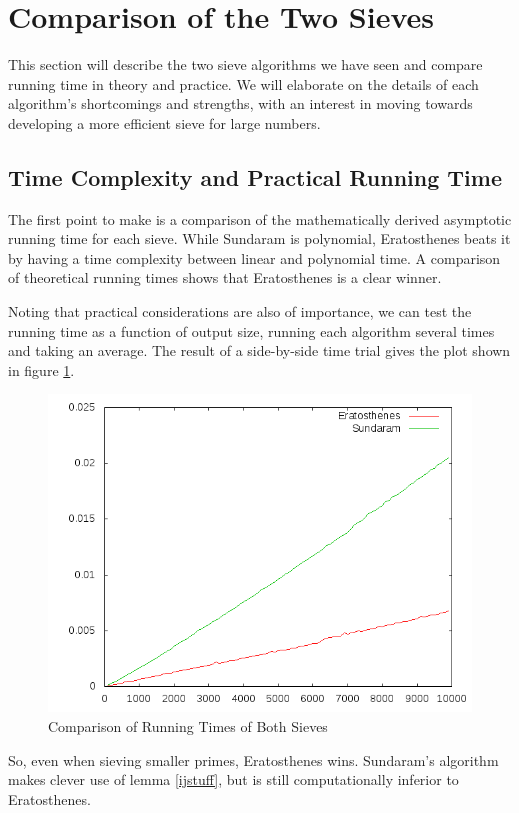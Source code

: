 \documentclass{amsart}
\theoremstyle{definition}
\theoremstyle{case}
\begin{document}
	\section{Comparison of the Two Sieves}
	
	This section will describe the two sieve algorithms we have seen and compare running time in theory and practice. We will elaborate on the details of each algorithm's shortcomings and strengths, with an interest in moving towards developing a more efficient sieve for large numbers.
	
	\subsection{Time Complexity and Practical Running Time}
	The first point to make is a comparison of the mathematically derived asymptotic running time for each sieve. While Sundaram is polynomial, Eratosthenes beats it by having a time complexity between linear and polynomial time. A comparison of theoretical running times shows that Eratosthenes is a clear winner.
	
	Noting that practical considerations are also of importance, we can test the running time as a function of output size, running each algorithm several times and taking an average. The result of a side-by-side time trial gives the plot shown in figure \ref{runtimevs}.
	
	\begin{figure}\caption{Comparison of Running Times of Both Sieves}
		\label{runtimevs}
		\includegraphics[scale=0.5]{both1.png}
	\end{figure}
	
	So, even when sieving smaller primes, Eratosthenes wins. Sundaram's algorithm makes clever use of lemma \ref{ijstuff}, but is still computationally inferior to Eratosthenes.

	
\end{document}
